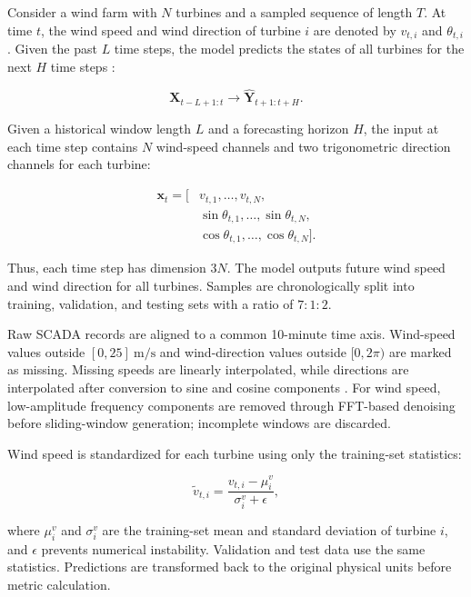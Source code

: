 Consider a wind farm with $N$ turbines and a sampled sequence of length $T$. At time $t$, the wind speed and wind direction of turbine $i$ are denoted by $v_{t,i}$ and $\theta_{t,i}$. Given the past $L$ time steps, the model predicts the states of all turbines for the next $H$ time steps \cite{Box2015TimeSeriesAnalysis,Makridakis2020M4Competition}:

\begin{equation}
\mathbf{X}_{t-L+1:t} \longrightarrow \hat{\mathbf{Y}}_{t+1:t+H}.
\end{equation}

Given a historical window length $L$ and a forecasting horizon $H$, the input at each time step contains $N$ wind-speed channels and two trigonometric direction channels for each turbine:

\begin{equation}
\begin{aligned}
\mathbf{x}_t = [&v_{t,1}, \ldots, v_{t,N},\\
&\sin\theta_{t,1}, \ldots, \sin\theta_{t,N},\\
&\cos\theta_{t,1}, \ldots, \cos\theta_{t,N} ] .
\end{aligned}
\end{equation}

Thus, each time step has dimension $3N$. The model outputs future wind speed and wind direction for all turbines. Samples are chronologically split into training, validation, and testing sets with a ratio of $7:1:2$.

Raw SCADA records are aligned to a common 10-minute time axis. Wind-speed values outside $[0,25]\ \mathrm{m/s}$ and wind-direction values outside $[0,2\pi)$ are marked as missing. Missing speeds are linearly interpolated, while directions are interpolated after conversion to sine and cosine components \cite{Wang2024ContinuousMissingValuesImputationGAN}. For wind speed, low-amplitude frequency components are removed through FFT-based denoising before sliding-window generation; incomplete windows are discarded.

Wind speed is standardized for each turbine using only the training-set statistics:

\begin{equation}
\tilde{v}_{t,i} = \frac{v_{t,i}-\mu_i^v}{\sigma_i^v+\epsilon},
\end{equation}

where $\mu_i^v$ and $\sigma_i^v$ are the training-set mean and standard deviation of turbine $i$, and $\epsilon$ prevents numerical instability. Validation and test data use the same statistics. Predictions are transformed back to the original physical units before metric calculation.

